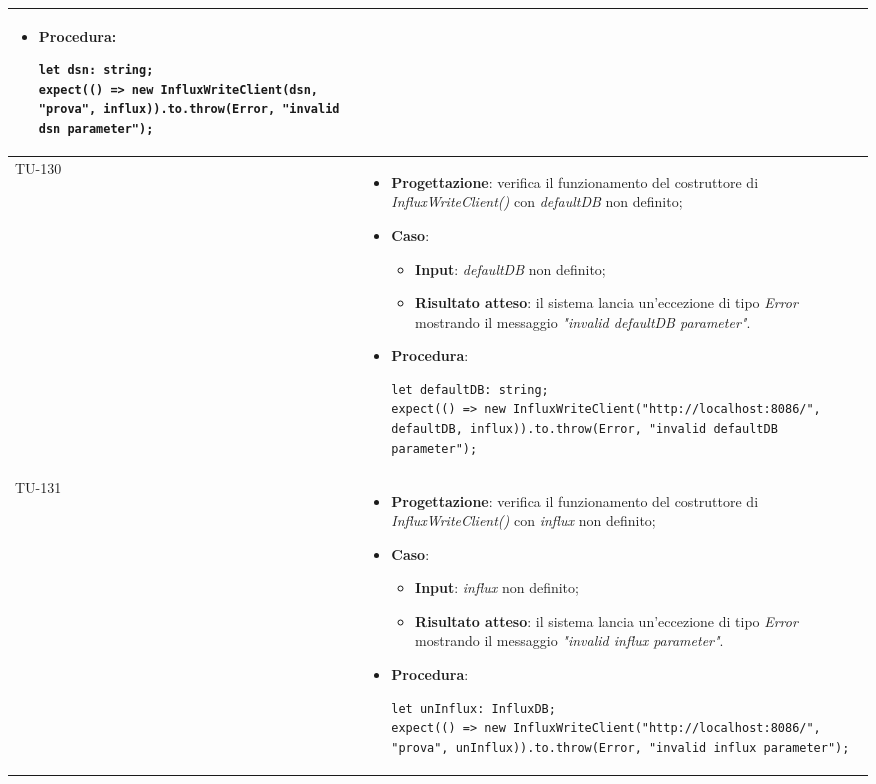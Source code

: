 \begin{longtable}{|C{1.5cm}|C{14.5cm}|}
\begin{itemize}
\begin{itemize}
	\end{itemize}
	\item \textbf{Procedura}:
	\begin{lstlisting}
let dsn: string;
expect(() => new InfluxWriteClient(dsn, "prova", influx)).to.throw(Error, "invalid dsn parameter");
	\end{lstlisting}
\end{itemize}\\
\hline
{TU-130} &
\begin{itemize}
	\item \textbf{Progettazione}: verifica il funzionamento del costruttore di \emph{InfluxWriteClient()} con \emph{defaultDB} non definito;
	\item \textbf{Caso}: 
	\begin{itemize}
		\item \textbf{Input}: \emph{defaultDB} non definito;
		\item \textbf{Risultato atteso}: il sistema lancia un'eccezione di tipo \emph{Error} mostrando il messaggio \emph{"invalid defaultDB parameter"}.
	\end{itemize}
	\item \textbf{Procedura}:
	\begin{lstlisting}
let defaultDB: string;
expect(() => new InfluxWriteClient("http://localhost:8086/", defaultDB, influx)).to.throw(Error, "invalid defaultDB parameter");
	\end{lstlisting}
\end{itemize}\\
\hline
{TU-131} &
\begin{itemize}
	\item \textbf{Progettazione}: verifica il funzionamento del costruttore di \emph{InfluxWriteClient()} con \emph{influx} non definito;
	\item \textbf{Caso}: 
	\begin{itemize}
		\item \textbf{Input}: \emph{influx} non definito;
		\item \textbf{Risultato atteso}: il sistema lancia un'eccezione di tipo \emph{Error} mostrando il messaggio \emph{"invalid influx parameter"}.
	\end{itemize}
	\item \textbf{Procedura}:
	\begin{lstlisting}
let unInflux: InfluxDB;
expect(() => new InfluxWriteClient("http://localhost:8086/", "prova", unInflux)).to.throw(Error, "invalid influx parameter");
	\end{lstlisting}

\end{itemize}
\end{longtable}
